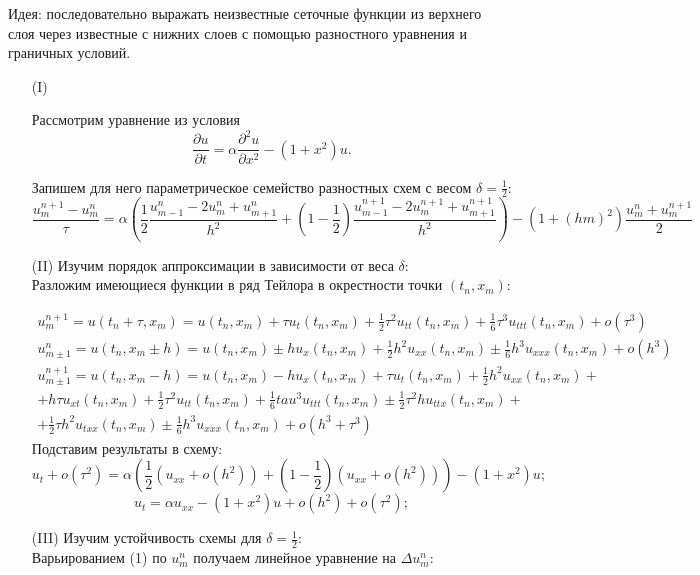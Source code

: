 \documentclass{article}
\theoremstyle{remark}
\theoremstyle{definition}
\begin{document}
	Идея: последовательно выражать неизвестные сеточные функции из верхнего слоя через известные с нижних слоев с помощью разностного уравнения и граничных условий.
	\begin{itemize}
	\item[(I)]
	
	Рассмотрим уравнение из условия
	$$
	\frac{\partial u}{\partial t} =\alpha \frac{\partial^2 u}{\partial x^2} -\left(1+x^2\right)u.
	$$
	
	Запишем для него параметрическое семейство разностных схем с весом $\delta =\frac 1 2$:
	\begin{equation}
	\frac{u^{n+1}_{m}-u^n_m}{\tau} = \alpha\left(\frac 1 2 \frac{u^n_{m-1}-2u^n_m+u^n_{m+1}}{h^2}+(1-\frac 1 2)\frac{u^{n+1}_{m-1}-2u^{n+1}_m+u^{n+1}_{m+1}}{h^2}\right)-\left(1+(hm)^2\right)\frac{u^n_m+u^{n+1}_m}2
	\end{equation}
	
	
\item[(II)]	Изучим порядок аппроксимации в зависимости от веса $\delta$:\\
Разложим имеющиеся функции в ряд Тейлора в окрестности точки $(t_n,x_m)$:
	
	\begin{multline*}u^{n+1}_m= u(t_n+\tau,x_m)=u(t_n,x_m)+\tau u_t(t_n,x_m)+\frac 1 2 \tau^2 u_{tt}(t_n,x_m)+\frac 1 6 \tau^3 u_{ttt}(t_n,x_m)+o(\tau^3)
	\end{multline*}	
	\begin{multline*}u^n_{m\pm1}= u(t_n,x_m\pm h)=u(t_n,x_m)\pm hu_x(t_n,x_m)+\frac 1 2 h^2 u_{xx}(t_n,x_m)\pm\frac 1 6 h^3 u_{xxx}(t_n,x_m)+o(h^3)
	\end{multline*}
	\begin{multline*}u^{n+1}_{m\pm1}= u(t_n,x_m- h)=u(t_n,x_m)-hu_x(t_n,x_m)+\tau u_t(t_n,x_m)+\frac 1 2 h^2 u_{xx}(t_n,x_m)+\\
	+h\tau u_{xt}(t_n,x_m)+\frac 1 2 \tau^2 u_{tt}(t_n,x_m)+\frac 1 6 tau^3 u_{ttt}(t_n,x_m)\pm\frac 1 2 \tau^2hu_{ttx}(t_n,x_m)+\\
	+\frac 1 2 \tau h^2u_{txx}(t_n,x_m)\pm\frac 1 6h^3u_{xxx}(t_n,x_m)+o(h^3+\tau^3)
	\end{multline*}
	Подставим результаты в схему:
	$$
	u_t+o(\tau^2)=\alpha\left(\frac 1 2(u_{xx}+o(h^2))+(1-\frac 1 2)(u_{xx}+o(h^2))\right)-(1+x^2)u;
	$$
	$$
	u_t=\alpha u_{xx}-(1+x^2)u+o(h^2)+o(\tau^2);
	$$
\item[(III)]Изучим устойчивость схемы для $\delta=\frac 1 2$:\\
Варьированием (1) по $u^n_m$ получаем линейное уравнение на $\Delta u^n_m$:


\end{itemize}
\end{document}
